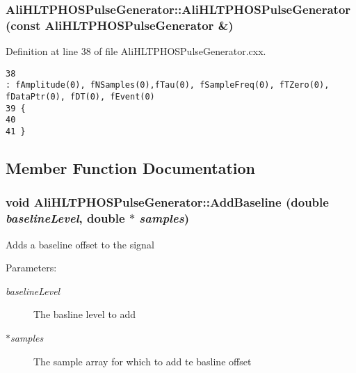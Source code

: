 \subsubsection{\setlength{\rightskip}{0pt plus 5cm}Ali\-HLTPHOSPulse\-Generator::Ali\-HLTPHOSPulse\-Generator (const {\bf Ali\-HLTPHOSPulse\-Generator} \&)}\label{classAliHLTPHOSPulseGenerator_AliHLTPHOSPulseGeneratora3}




Definition at line 38 of file Ali\-HLTPHOSPulse\-Generator.cxx.

\footnotesize\begin{verbatim}38                                                                                   : fAmplitude(0), fNSamples(0),fTau(0), fSampleFreq(0), fTZero(0), fDataPtr(0), fDT(0), fEvent(0)
39 {
40   
41 }
\end{verbatim}\normalsize 




\subsection{Member Function Documentation}
\subsubsection{\setlength{\rightskip}{0pt plus 5cm}void Ali\-HLTPHOSPulse\-Generator::Add\-Baseline (double {\em baseline\-Level}, double $\ast$ {\em samples})}\label{classAliHLTPHOSPulseGenerator_AliHLTPHOSPulseGeneratora5}


Adds a baseline offset to the signal \begin{Desc}
\item[Parameters:]
\begin{description}
\item[{\em baseline\-Level}]The basline level to add \item[{\em $\ast$samples}]The sample array for which to add te basline offset \end{description}
\end{Desc}



